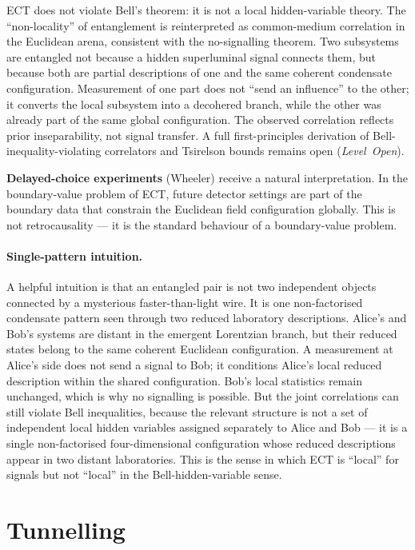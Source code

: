 \documentclass[11pt,a4paper]{article}
\begin{document}
ECT does not violate Bell's theorem: it is not a local hidden-variable theory. The ``non-locality'' of entanglement is reinterpreted as common-medium correlation in the Euclidean arena, consistent with the no-signalling theorem. Two subsystems are entangled not because a hidden superluminal signal connects them, but because both are partial descriptions of one and the same coherent condensate configuration. Measurement of one part does not ``send an influence'' to the other; it converts the local subsystem into a decohered branch, while the other was already part of the same global configuration. The observed correlation reflects prior inseparability, not signal transfer. A full first-principles derivation of Bell-inequality-violating correlators and Tsirelson bounds remains open (\emph{Level~Open}).

\textbf{Delayed-choice experiments} (Wheeler) receive a natural interpretation. In the boundary-value problem of ECT, future detector settings are part of the boundary data that constrain the Euclidean field configuration globally. This is not retrocausality --- it is the standard behaviour of a boundary-value problem.

\paragraph{Single-pattern intuition.}
A helpful intuition is that an entangled pair is not two independent objects connected by a mysterious faster-than-light wire. It is one non-factorised condensate pattern seen through two reduced laboratory descriptions. Alice's and Bob's systems are distant in the emergent Lorentzian branch, but their reduced states belong to the same coherent Euclidean configuration. A measurement at Alice's side does not send a signal to Bob; it conditions Alice's local reduced description within the shared configuration. Bob's local statistics remain unchanged, which is why no signalling is possible. But the joint correlations can still violate Bell inequalities, because the relevant structure is not a set of independent local hidden variables assigned separately to Alice and Bob --- it is a single non-factorised four-dimensional configuration whose reduced descriptions appear in two distant laboratories. This is the sense in which ECT is ``local'' for signals but not ``local'' in the Bell-hidden-variable sense.


\section{Tunnelling}
\end{document}
